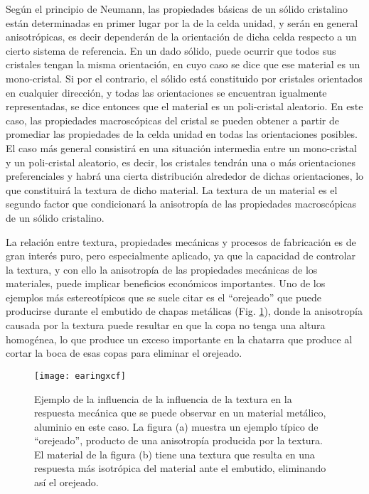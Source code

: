 Según el principio de Neumann\cite{nye1985physical}, las propiedades básicas de un sólido cristalino están determinadas en primer lugar por la de la celda unidad, y serán en general anisotrópicas, es decir dependerán de la orientación de dicha celda respecto a un cierto sistema de referencia.
En un dado sólido, puede ocurrir que todos sus cristales tengan la misma orientación, en cuyo caso se dice que ese material es un mono-cristal.
Si por el contrario, el sólido está constituido por cristales orientados en cualquier dirección, y todas las orientaciones se encuentran igualmente representadas, se dice entonces que el material es un poli-cristal aleatorio.
En este caso, las propiedades macroscópicas del cristal se pueden obtener a partir de promediar las propiedades de la celda unidad en todas las orientaciones posibles.
El caso más general consistirá en una situación intermedia entre un mono-cristal y un poli-cristal aleatorio, es decir, los cristales tendrán una o más orientaciones preferenciales y habrá una cierta distribución alrededor de dichas orientaciones, lo que constituirá la textura de dicho material. 
La textura de un material es el segundo factor que condicionará la anisotropía de las propiedades macroscópicas de un sólido cristalino.

La relación entre textura, propiedades mecánicas y procesos de fabricación es de gran interés puro, pero especialmente aplicado, ya que la capacidad de controlar la textura, y con ello la anisotropía de las propiedades mecánicas de los materiales, puede implicar beneficios económicos importantes.
Uno de los ejemplos más estereotípicos que se suele citar es el ``orejeado'' que puede producirse durante el embutido de chapas metálicas (Fig. \ref{fig:earing}), donde la anisotropía causada por la textura puede resultar en que la copa no tenga una altura homogénea, lo que produce un exceso importante en la chatarra que produce al cortar la boca de esas copas para eliminar el orejeado.

\begin{figure}[!htb]
  \centering
  \texttt{[image: earingxcf]}
  \caption{Ejemplo de la influencia de la influencia de la textura en la respuesta mecánica que se puede observar en un material metálico, aluminio en este caso. La figura (a) muestra un ejemplo típico de ``orejeado'', producto de una anisotropía producida por la textura. El material de la figura (b) tiene una textura que resulta en una respuesta más isotrópica del material ante el embutido, eliminando así el orejeado. }
  \label{fig:earing}
\end{figure}

